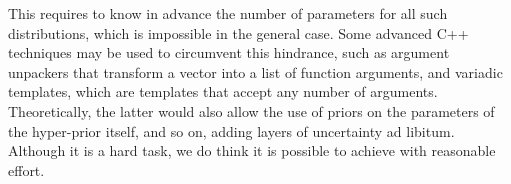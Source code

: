 \begin{itemize}
	This requires to know in advance the number of parameters for all such distributions, which is impossible in the general case.
	Some advanced C++ techniques may be used to circumvent this hindrance, such as argument unpackers that transform a vector into a list of function arguments, and variadic templates, which are templates that accept any number of arguments.
	Theoretically, the latter would also allow the use of priors on the parameters of the hyper-prior itself, and so on, adding layers of uncertainty ad libitum.
	Although it is a hard task, we do think it is possible to achieve with reasonable effort.
\end{itemize}
